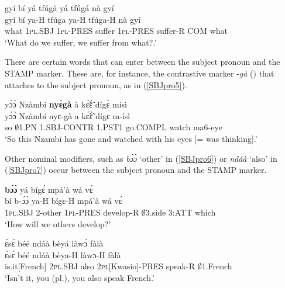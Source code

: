 \begin{exe} 
\ex\label{SBJpro4}
  \glll     gyí bí yá tfúgà yá tfúgá nà gyí\\
             gyí bí ya-H tfúga ya-H tfúga-H nà gyí\\
              what 1\textsc{pl}.SBJ 1\textsc{pl}-PRES suffer 1\textsc{pl}-PRES suffer-R COM what \\
    \trans `What do we suffer, we suffer from what?.'
\end{exe}

There are certain words that can enter between the subject pronoun and the STAMP marker. These are, for instance, the contrastive marker -{\itshape gà}  () that attaches to the subject pronoun, as in (\ref{SBJpro5}).

\begin{exe} 
\ex\label{SBJpro5}
  \glll  yɔ́ɔ̀ Nzàmbí {\bfseries nyɛ̀gà} à kɛ̃́ɛ̃̀ dígɛ̀ mísì \\
         yɔ́ɔ̀ Nzàmbí nyɛ-gà a kɛ̃́ɛ̃̀ dígɛ m-ísì \\
           so $\emptyset$1.PN 1.SBJ-CONTR 1.PST1 go.COMPL watch ma6-eye  \\
    \trans `So this Nzambi has gone and watched with his eyes [= was thinking].'
\end{exe}

\noindent Other nominal modifiers, such as {\itshape bɔ́ɔ̀} `other' in (\ref{SBJpro6}) or {\itshape ndáà}  `also' in (\ref{SBJpro7}) occur between the subject pronoun and the STAMP marker.

\begin{exe} 
\ex\label{SBJpro6}
   {\bfseries bɔ́ɔ̀} yá bígɛ́ mpá'à wá vɛ́ \\
           bí b-ɔ́ɔ̀ ya-H bígɛ-H mpá'à wá vɛ́ \\
           1\textsc{pl}.SBJ 2-other 1\textsc{pl}-PRES develop-R $\emptyset$3.side 3:ATT which  \\
    \trans `How will we others develop?'
\end{exe}

\begin{exe} 
\ex\label{SBJpro7} 
  \glll  ɛ̀sɛ́ béé ndáà bèyá làwɔ́ fàlà \\
       ɛ̀sɛ́ béé ndáà bèya-H làwɔ-H fàlà \\
        is.it[French] 2\textsc{pl}.SBJ also 2\textsc{pl}[Kwasio]-PRES speak-R $\emptyset$1.French  \\
    \trans `Isn't it, you (pl.), you also speak French.'
\end{exe}






